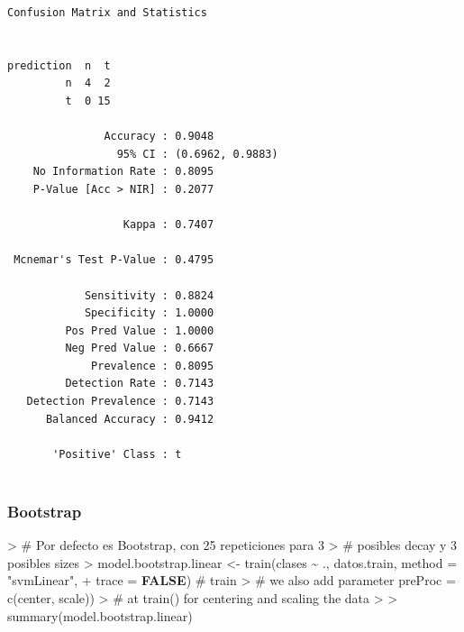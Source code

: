 \documentclass[
]{article}
\newenvironment{Shaded}{\begin{snugshade}}{\end{snugshade}}
\newcommand{\AttributeTok}[1]{\textcolor[rgb]{0.80,0.80,0.80}{#1}}
\newcommand{\CommentTok}[1]{\textcolor[rgb]{0.50,0.62,0.50}{#1}}
\newcommand{\ConstantTok}[1]{\textcolor[rgb]{0.86,0.64,0.64}{\textbf{#1}}}
\newcommand{\ErrorTok}[1]{\textcolor[rgb]{0.76,0.75,0.62}{#1}}
\newcommand{\FunctionTok}[1]{\textcolor[rgb]{0.94,0.94,0.56}{#1}}
\newcommand{\NormalTok}[1]{\textcolor[rgb]{0.80,0.80,0.80}{#1}}
\newcommand{\OtherTok}[1]{\textcolor[rgb]{0.94,0.94,0.56}{#1}}
\newcommand{\SpecialCharTok}[1]{\textcolor[rgb]{0.86,0.64,0.64}{#1}}
\newcommand{\StringTok}[1]{\textcolor[rgb]{0.80,0.58,0.58}{#1}}
\begin{document}
\begin{verbatim}
Confusion Matrix and Statistics

          
prediction  n  t
         n  4  2
         t  0 15
                                          
               Accuracy : 0.9048          
                 95% CI : (0.6962, 0.9883)
    No Information Rate : 0.8095          
    P-Value [Acc > NIR] : 0.2077          
                                          
                  Kappa : 0.7407          
                                          
 Mcnemar's Test P-Value : 0.4795          
                                          
            Sensitivity : 0.8824          
            Specificity : 1.0000          
         Pos Pred Value : 1.0000          
         Neg Pred Value : 0.6667          
             Prevalence : 0.8095          
         Detection Rate : 0.7143          
   Detection Prevalence : 0.7143          
      Balanced Accuracy : 0.9412          
                                          
       'Positive' Class : t               
                                          
\end{verbatim}

\hypertarget{bootstrap}{%
\subsubsection{Bootstrap}\label{bootstrap}}

\begin{Shaded}
\begin{Highlighting}[]
\SpecialCharTok{\textgreater{}} \CommentTok{\# Por defecto es Bootstrap, con 25 repeticiones para 3}
\ErrorTok{\textgreater{}} \CommentTok{\# posibles decay y 3 posibles sizes}
\ErrorTok{\textgreater{}}\NormalTok{ model.bootstrap.linear }\OtherTok{\textless{}{-}} \FunctionTok{train}\NormalTok{(clases }\SpecialCharTok{\textasciitilde{}}\NormalTok{ ., datos.train, }\AttributeTok{method =} \StringTok{"svmLinear"}\NormalTok{,}
\SpecialCharTok{+}     \AttributeTok{trace =} \ConstantTok{FALSE}\NormalTok{)  }\CommentTok{\# train}
\SpecialCharTok{\textgreater{}} \CommentTok{\# we also add parameter \textquotesingle{}preProc = c(\textquotesingle{}center\textquotesingle{}, \textquotesingle{}scale\textquotesingle{}))\textquotesingle{}}
\ErrorTok{\textgreater{}} \CommentTok{\# at train() for centering and scaling the data}
\ErrorTok{\textgreater{}} 
\ErrorTok{\textgreater{}} \FunctionTok{summary}\NormalTok{(model.bootstrap.linear)}
\end{Highlighting}
\end{Shaded}
\end{document}
